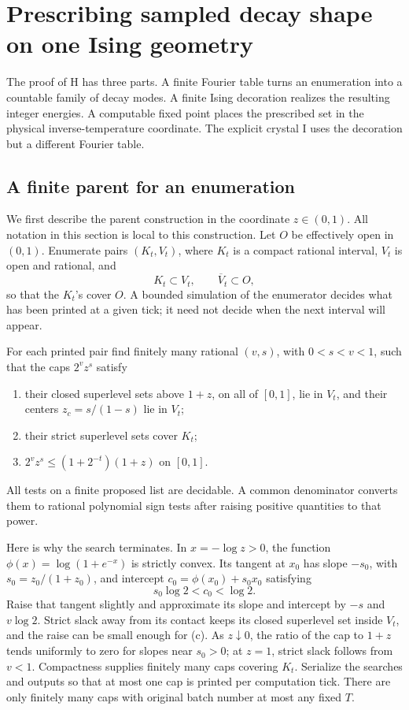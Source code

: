 \section{Prescribing sampled decay shape on one Ising geometry}\label{sec:ising-diagrams}

The proof of H has three parts. A finite Fourier table turns an enumeration into a countable family of decay modes. A finite Ising decoration realizes the resulting integer energies. A computable fixed point places the prescribed set in the physical inverse-temperature coordinate. The explicit crystal I uses the decoration but a different Fourier table.

\subsection{A finite parent for an enumeration}\label{sec:cap-parent}

We first describe the parent construction in the coordinate \(z\in(0,1)\). All notation in this section is local to this construction. Let \(O\) be effectively open in \((0,1)\). Enumerate pairs \((K_t,V_t)\), where \(K_t\) is a compact rational interval, \(V_t\) is open and rational, and
\[
 K_t\subset V_t,\qquad \overline V_t\subset O,
\]
so that the \(K_t\)'s cover \(O\). A bounded simulation of the enumerator decides what has been printed at a given tick; it need not decide when the next interval will appear.

For each printed pair find finitely many rational \((v,s)\), with \(0<s<v<1\), such that the caps \(2^v z^s\) satisfy
\begin{enumerate}[label=\textup{(\alph*)}]
\item their closed superlevel sets above \(1+z\), on all of \([0,1]\), lie in \(V_t\), and their centers \(z_c=s/(1-s)\) lie in \(V_t\);
\item their strict superlevel sets cover \(K_t\);
\item \(2^vz^s\le(1+2^{-t})(1+z)\) on \([0,1]\).
\end{enumerate}
All tests on a finite proposed list are decidable. A common denominator converts them to rational polynomial sign tests after raising positive quantities to that power.

Here is why the search terminates. In \(x=-\log z>0\), the function \(\phi(x)=\log(1+e^{-x})\) is strictly convex. Its tangent at \(x_0\) has slope \(-s_0\), with \(s_0=z_0/(1+z_0)\), and intercept \(c_0=\phi(x_0)+s_0x_0\) satisfying
\[
 s_0\log2<c_0<\log2.
\]
Raise that tangent slightly and approximate its slope and intercept by \(-s\) and \(v\log2\). Strict slack away from its contact keeps its closed superlevel set inside \(V_t\), and the raise can be small enough for (c). As \(z\downarrow0\), the ratio of the cap to \(1+z\) tends uniformly to zero for slopes near \(s_0>0\); at \(z=1\), strict slack follows from \(v<1\). Compactness supplies finitely many caps covering \(K_t\). Serialize the searches and outputs so that at most one cap is printed per computation tick. There are only finitely many caps with original batch number at most any fixed \(T\).

